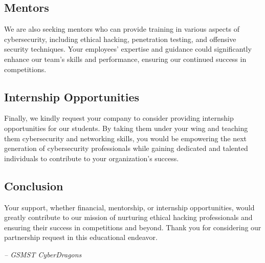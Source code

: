 \documentclass[
  letterpaper,
  DIV=11,
  numbers=noendperiod]{scrartcl}
\begin{document}
\hypertarget{mentors}{%
\subsection{Mentors}\label{mentors}}

We are also seeking mentors who can provide training in various aspects
of cybersecurity, including ethical hacking, penetration testing, and
offensive security techniques. Your employees' expertise and guidance
could significantly enhance our team's skills and performance, ensuring
our continued success in competitions.

\hypertarget{internship-opportunities}{%
\subsection{Internship Opportunities}\label{internship-opportunities}}

Finally, we kindly request your company to consider providing internship
opportunities for our students. By taking them under your wing and
teaching them cybersecurity and networking skills, you would be
empowering the next generation of cybersecurity professionals while
gaining dedicated and talented individuals to contribute to your
organization's success.

\hypertarget{conclusion}{%
\subsection{Conclusion}\label{conclusion}}

Your support, whether financial, mentorship, or internship
opportunities, would greatly contribute to our mission of nurturing
ethical hacking professionals and ensuring their success in competitions
and beyond. Thank you for considering our partnership request in this
educational endeavor.

\emph{-- GSMST CyberDragons}
\end{document}
